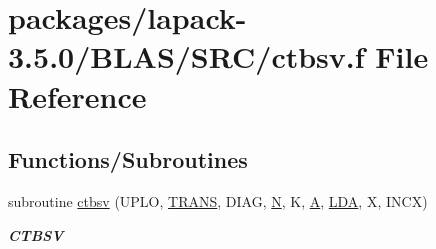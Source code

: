 \hypertarget{lapack-3_85_80_2BLAS_2SRC_2ctbsv_8f}{}\section{packages/lapack-\/3.5.0/\+B\+L\+A\+S/\+S\+R\+C/ctbsv.f File Reference}
\label{lapack-3_85_80_2BLAS_2SRC_2ctbsv_8f}
\subsection*{Functions/\+Subroutines}
\begin{DoxyCompactItemize}
\item 
subroutine \hyperlink{group__complex__blas__level2_ga47f0128bb830b67b37b285af34eaad5f}{ctbsv} (U\+P\+L\+O, \hyperlink{superlu__enum__consts_8h_a0c4e17b2d5cea33f9991ccc6a6678d62a1f61e3015bfe0f0c2c3fda4c5a0cdf58}{T\+R\+A\+N\+S}, D\+I\+A\+G, \hyperlink{polmisc_8c_a0240ac851181b84ac374872dc5434ee4}{N}, K, \hyperlink{classA}{A}, \hyperlink{example__user_8c_ae946da542ce0db94dced19b2ecefd1aa}{L\+D\+A}, X, I\+N\+C\+X)
\begin{DoxyCompactList}\small\item\em {\bfseries C\+T\+B\+S\+V} \end{DoxyCompactList}\end{DoxyCompactItemize}
